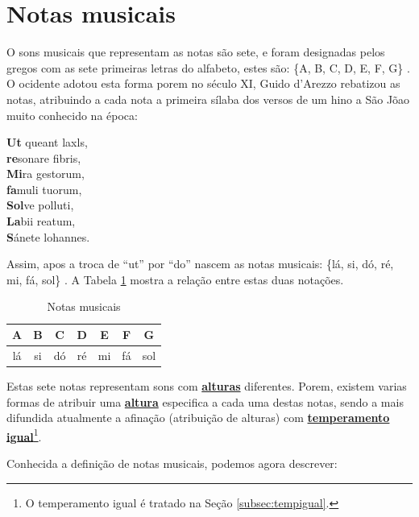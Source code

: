 \section{Notas musicais}
\label{sec:notasmusicais}

O sons musicais que representam as notas são sete, 
e foram designadas pelos gregos com as sete primeiras letras do alfabeto,
estes são: \{A, B, C, D, E, F, G\} \cite[pp. 11]{grabner2001teoria} \cite[pp. 9]{cardoso1973curso}.
O ocidente adotou esta forma porem no século XI, 
Guido d'Arezzo rebatizou as notas, 
atribuindo a cada nota a primeira sílaba dos versos
de um hino a São Jõao muito conhecido na época:
\begin{citando}%
\textbf{Ut} queant laxls,\\
\textbf{re}sonare fibris,\\
\textbf{Mi}ra gestorum,\\
\textbf{fa}muli tuorum,\\
\textbf{Sol}ve polluti,\\
\textbf{La}bii reatum,\\
\textbf{S}ánete lohannes.
\end{citando}
 Assim, apos a troca de ``ut'' por ``do'' nascem as notas musicais: 
\{lá, si, dó, ré, mi, fá, sol\} \cite[pp. 21]{arbones2012armonia} \cite[pp. 7]{cardoso1973curso}. 
A Tabela \ref{tab:notasmusic} mostra a relação entre estas duas notações.

\begin{table}[h]
\centering
\begin{tabular}{|c|c|c|c|c|c|c|}
\hline
A  & B  & C  & D  & E  & F  & G\\ \hline
lá & si & dó & ré & mi & fá & sol \\ \hline
\end{tabular}
\caption{Notas musicais}
\label{tab:notasmusic}
\end{table}

Estas sete notas representam sons com \hyperref[sec:pos:Altura]{\textbf{alturas}} diferentes.
Porem, existem varias formas de atribuir uma \hyperref[sec:pos:Altura]{\textbf{altura}} 
especifica a cada uma destas notas, 
sendo a mais difundida atualmente a afinação (atribuição de alturas) com \hyperref[subsec:tempigual]{\textbf{temperamento igual}}\footnote{O temperamento igual é tratado na Seção \ref{subsec:tempigual}.}.




Conhecida a definição de notas musicais, podemos agora descrever:


